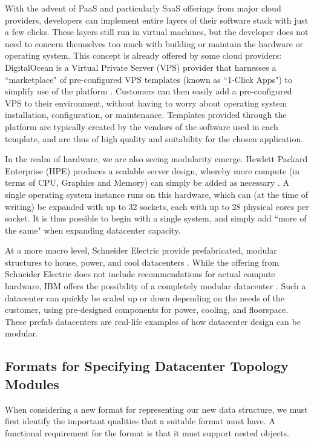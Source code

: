 \documentclass[11pt]{article}
\begin{document}
		With the advent of PaaS and particularly SaaS offerings from major cloud providers, developers can implement entire layers of their software stack with just a few clicks. 
		These layers still run in virtual machines, but the developer does not need to concern themselves too much with building or maintain the hardware or operating system.
		This concept is already offered by some cloud providers: DigitalOcean is a Virtual Private Server (VPS) provider that harnesses a ``marketplace" of pre-configured VPS templates (known as ``1-Click Apps") to simplify use of the platform \cite{DigitalOcean2020}. 
		Customers can then easily add a pre-configured VPS to their environment, without having to worry about operating system installation, configuration, or maintenance. 
		Templates provided through the platform are typically created by the vendors of the software used in each template, and are thus of high quality and suitability for the chosen application.

		In the realm of hardware, we are also seeing modularity emerge. 
		Hewlett Packard Enterprise (HPE) produces a scalable server design, whereby more compute (in terms of CPU, Graphics and Memory) can simply be added as necessary \cite{Bang2020}.
		A single operating system instance runs on this hardware, which can (at the time of writing) be expanded with up to 32 sockets, each with up to 28 physical cores per socket.
		It is thus possible to begin with a single system, and simply add ``more of the same" when expanding datacenter capacity.

		At a more macro level, Schneider Electric provide prefabricated, modular structures to house, power, and cool datacenters \cite{Torell2014, Torell2017}.
		While the offering from Schneider Electric does not include recommendations for actual compute hardware, IBM offers the possibility of a completely modular datacenter \cite{IBM2014}.
		Such a datacenter can quickly be scaled up or down depending on the needs of the customer, using pre-designed components for power, cooling, and floorspace. 
		These prefab datacenters are real-life examples of how datacenter design can be modular.

	
	\subsection{Formats for Specifying Datacenter Topology Modules}
		When considering a new format for representing our new data structure, we must first identify the important qualities that a suitable format must have. 
		A functional requirement for the format is that it must support nested objects. 
\end{document}
